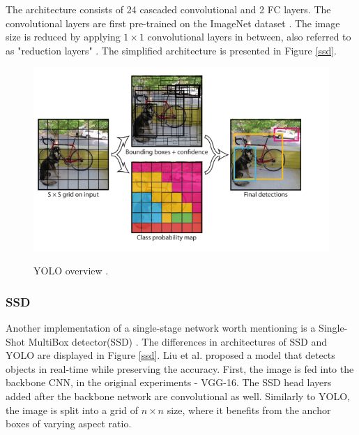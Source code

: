 \documentclass[english, 12pt, a4paper, elec, utf8, a-1b, online]{aaltothesis}
\begin{document}
The architecture consists of 24 cascaded convolutional and 2 FC layers. The convolutional layers are first pre-trained on the ImageNet dataset \cite{Russakovsky2014}. The image size is reduced by applying $1\times1$ convolutional layers in between, also referred to as "reduction layers"  \cite{Redmon2015a}. The simplified architecture is presented in Figure \ref{ssd}.

\begin{figure}[htb]
	\begin{center}
		\includegraphics[width=12cm]{./yolo.png}
	\end{center}
	\caption{YOLO overview \cite{Redmon2015a}.}
	\begin{center}
		\label{yolo}
	\end{center}
\end{figure}
\FloatBarrier





\subsubsection{SSD}
Another implementation of a single-stage network worth mentioning is a Single-Shot MultiBox detector(SSD) \cite{Liu2015}. The differences in architectures of SSD and YOLO are displayed in Figure \ref{ssd}. Liu et al. proposed a model that detects objects in real-time while preserving the accuracy. First, the image is fed into the backbone CNN, in the original experiments - VGG-16. The SSD head layers added after the backbone network are convolutional as well. Similarly to YOLO, the image is split into a grid of $n\times n$ size, where it benefits from the anchor boxes of varying aspect ratio. 
\end{document}
